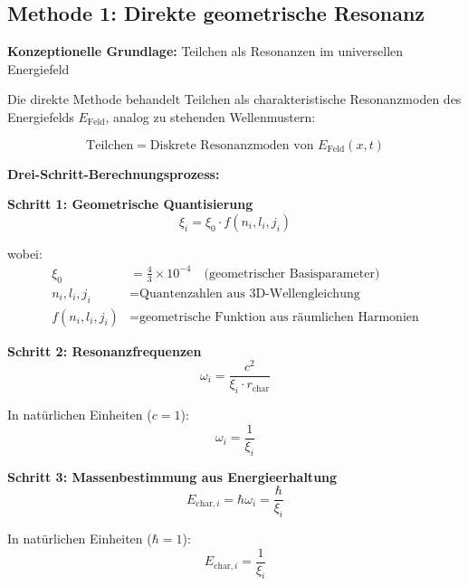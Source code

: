 \documentclass[12pt,a4paper]{article}
\newcommand{\Efield}{E_{\text{Feld}}}
\begin{document}
	\subsection{Methode 1: Direkte geometrische Resonanz}
	\label{subsec:direct_geometric_method}
	
	\textbf{Konzeptionelle Grundlage:} Teilchen als Resonanzen im universellen Energiefeld
	
	Die direkte Methode behandelt Teilchen als charakteristische Resonanzmoden des Energiefelds $\Efield$, analog zu stehenden Wellenmustern:
	
	\begin{equation}
		\text{Teilchen} = \text{Diskrete Resonanzmoden von } \Efield(x,t)
	\end{equation}
	
	\textbf{Drei-Schritt-Berechnungsprozess:}
	
	\textbf{Schritt 1: Geometrische Quantisierung}
	\begin{equation}
		\xi_i = \xi_0 \cdot f(n_i, l_i, j_i)
		\label{eq:geometric_quantization}
	\end{equation}
	
	wobei:
	\begin{align}
		\xi_0 &= \frac{4}{3} \times 10^{-4} \quad \text{(geometrischer Basisparameter)} \\
		n_i, l_i, j_i &= \text{Quantenzahlen aus 3D-Wellengleichung} \\
		f(n_i, l_i, j_i) &= \text{geometrische Funktion aus räumlichen Harmonien}
	\end{align}
	
	\textbf{Schritt 2: Resonanzfrequenzen}
	\begin{equation}
		\omega_i = \frac{c^2}{\xi_i \cdot r_{\text{char}}}
		\label{eq:resonance_frequencies}
	\end{equation}
	
	In natürlichen Einheiten ($c = 1$):
	\begin{equation}
		\omega_i = \frac{1}{\xi_i}
	\end{equation}
	
	\textbf{Schritt 3: Massenbestimmung aus Energieerhaltung}
	\begin{equation}
		E_{\text{char},i} = \hbar \omega_i = \frac{\hbar}{\xi_i}
		\label{eq:energy_from_frequency}
	\end{equation}
	
	In natürlichen Einheiten ($\hbar = 1$):
	\begin{equation}
		\boxed{E_{\text{char},i} = \frac{1}{\xi_i}}
		\label{eq:characteristic_energy_direct}
	\end{equation}
	
\end{document}
